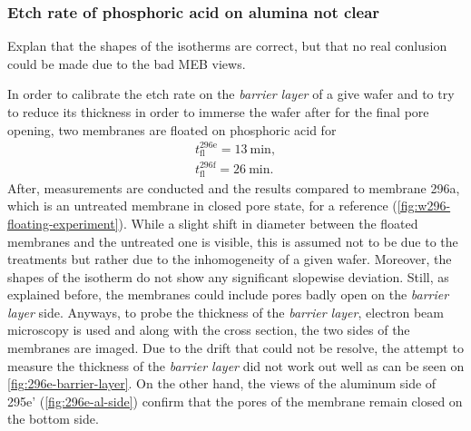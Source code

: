 \documentclass[../thesis.tex]{subfiles}
\begin{document}
            \subsubsection{Etch rate of phosphoric acid on alumina not clear}
            \label{subsec:floating-experiment}

              Explan that the shapes of the isotherms are correct, but that no real conlusion could be made due to the bad MEB views.

              

              In order to calibrate the etch rate on the \textit{barrier layer} of a give wafer and to try to reduce its thickness in order to immerse the wafer after for the final pore opening, two membranes are floated on phosphoric acid for
              \begin{equation}
                  \begin{split}
                      t^\mathrm{296e}_\mathrm{fl}=\SI{13}{\minute}, \\
                      t^\mathrm{296f}_\mathrm{fl}=\SI{26}{\minute}.
                  \end{split}
                  \label{eq:floating-times}
              \end{equation}
              After, measurements are conducted and the results compared to membrane 296a, which is an untreated membrane in closed pore state, for a reference (\cref{fig:w296-floating-experiment}). While a slight shift in diameter between the floated membranes and the untreated one is visible, this is assumed not to be due to the treatments but rather due to the inhomogeneity of a given wafer. Moreover, the shapes of the isotherm do not show any significant slopewise deviation. Still, as explained before, the membranes could include pores badly open on the \textit{barrier layer} side. Anyways, to probe the thickness of the \textit{barrier layer}, electron beam microscopy is used and along with the cross section, the two sides of the membranes are imaged. Due to the drift that could not be resolve, the attempt to measure the thickness of the \textit{barrier layer} did not work out well as can be seen on \cref{fig:296e-barrier-layer}. On the other hand, the views of the aluminum side of 295e' (\cref{fig:296e-al-side}) confirm that the pores of the membrane remain closed on the bottom side.
\end{document}
